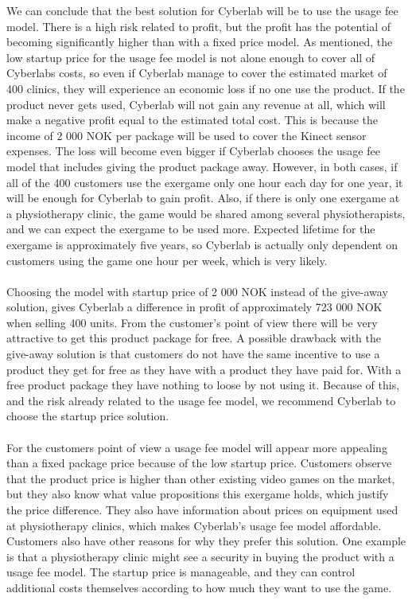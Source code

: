 We can conclude that the best solution for Cyberlab will be to use the usage fee model. There is a high risk related to profit, but the profit has the potential of becoming significantly higher than with a fixed price model. As mentioned, the low startup price for the usage fee model is not alone enough to cover all of Cyberlabs costs, so even if Cyberlab manage to cover the estimated market of 400 clinics, they will experience an economic loss if no one use the product. If the product never gets used, Cyberlab will not gain any revenue at all, which will make a negative profit equal to the estimated total cost. This is because the income of 2 000 NOK per package will be used to cover the Kinect sensor expenses. The loss will become even bigger if Cyberlab chooses the usage fee model that includes giving the product package away. However, in both cases, if all of the 400 customers use the exergame only one hour each day for one year, it will be enough for Cyberlab to gain profit. Also, if there is only one exergame at a physiotherapy clinic, the game would be shared among several physiotherapists, and we can expect the exergame to be used more. Expected lifetime for the exergame is approximately five years, so Cyberlab is actually only dependent on customers using the game one hour per week, which is very likely. \\ \\   
Choosing the model with startup price of 2 000 NOK instead of the give-away solution, gives Cyberlab a difference in profit of approximately 723 000 NOK when selling 400 units. From the customer's point of view there will be very attractive to get this product package for free. A possible drawback with the give-away solution is that customers do not have the same incentive to use a product they get for free as they have with a product they have paid for. With a free product package they have nothing to loose by not using it. Because of this, and the risk already related to the usage fee model, we recommend Cyberlab to choose the startup price solution. \\ \\ 
For the customers point of view a usage fee model will appear more appealing than a fixed package price because of the low startup price. Customers observe that the product price is higher than other existing video games on the market, but they also know what value propositions this exergame holds, which justify the price difference. They also have information about prices on equipment used at physiotherapy clinics, which makes Cyberlab’s usage fee model affordable. Customers also have other reasons for why they prefer this solution. One example is that a physiotherapy clinic might see a security in buying the product with a usage fee model. The startup price is manageable, and they can control additional costs themselves according to how much they want to use the game. \\ \\
